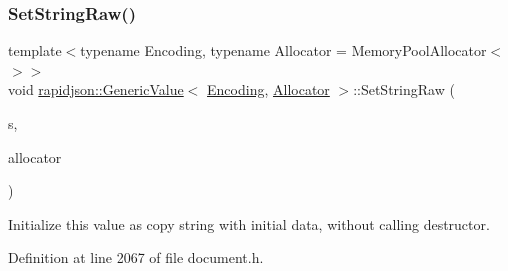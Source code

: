 \subsubsection{\texorpdfstring{SetStringRaw()}{SetStringRaw()}\hspace{0.1cm}{\footnotesize\ttfamily [2/2]}}
{\footnotesize\ttfamily template$<$typename Encoding, typename Allocator = Memory\+Pool\+Allocator$<$$>$$>$ \\
void \mbox{\hyperlink{classrapidjson_1_1_generic_value}{rapidjson\+::\+Generic\+Value}}$<$ \mbox{\hyperlink{classrapidjson_1_1_encoding}{Encoding}}, \mbox{\hyperlink{classrapidjson_1_1_allocator}{Allocator}} $>$\+::Set\+String\+Raw (\begin{DoxyParamCaption}\item[{\mbox{\hyperlink{classrapidjson_1_1_generic_value_a559eb9cea54364a35518b02f6d74f379}{String\+Ref\+Type}}}]{s,  }\item[{\mbox{\hyperlink{classrapidjson_1_1_allocator}{Allocator}} \&}]{allocator }\end{DoxyParamCaption})}



Initialize this value as copy string with initial data, without calling destructor. 



Definition at line 2067 of file document.\+h.


